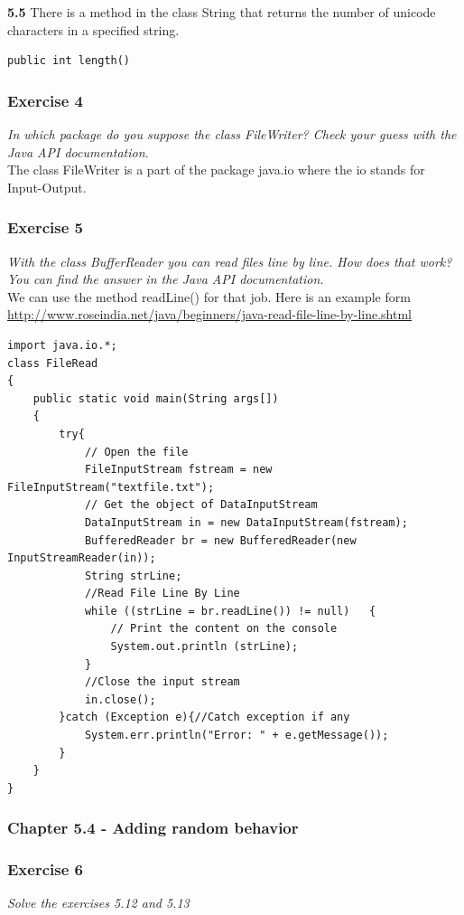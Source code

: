 \textbf{5.5} There is a method in the class String that returns the number
of unicode characters in a specified string.

\begin{lstlisting}
public int length()
\end{lstlisting}

\subsubsection*{Exercise 4}
\textit{In which package do you suppose the class FileWriter?
Check your guess with the Java API documentation.}\\

The class FileWriter is a part of the package java.io where the io stands
for Input-Output.

\subsubsection*{Exercise 5}
\textit{With the class BufferReader you can read files line by line.
How does that work? You can find the answer in the Java API documentation.}\\

We can use the method readLine() for that job. Here is an example form
\url{http://www.roseindia.net/java/beginners/java-read-file-line-by-line.shtml}

\begin{lstlisting}
import java.io.*;
class FileRead 
{
 	public static void main(String args[])
  	{
  		try{
  			// Open the file
			FileInputStream fstream = new FileInputStream("textfile.txt");
  			// Get the object of DataInputStream
  			DataInputStream in = new DataInputStream(fstream);
  			BufferedReader br = new BufferedReader(new InputStreamReader(in));
  			String strLine;
  			//Read File Line By Line
  			while ((strLine = br.readLine()) != null)   {
  				// Print the content on the console
				System.out.println (strLine);
  			}
  			//Close the input stream
  			in.close();
		}catch (Exception e){//Catch exception if any
			System.err.println("Error: " + e.getMessage());
  		}
	}
}
\end{lstlisting}

\subsubsection{Chapter 5.4 - Adding random behavior}

\subsubsection*{Exercise 6}
\textit{Solve the exercises 5.12 and 5.13}\\

